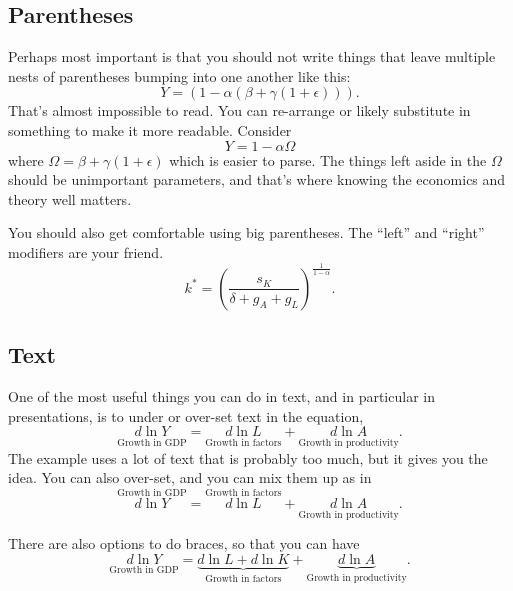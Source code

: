 \documentclass{article}
\begin{document}
\subsection*{Parentheses}
Perhaps most important is that you should not write things that leave multiple nests of parentheses bumping into one another like this:
\begin{equation*}
    Y = (1-\alpha(\beta+\gamma(1+\epsilon))).
\end{equation*}
That's almost impossible to read. You can re-arrange or likely substitute in something to make it more readable. Consider 
\begin{equation*}
    Y = 1-\alpha \Omega
\end{equation*}
where $\Omega = \beta+ \gamma(1+\epsilon)$ which is easier to parse. The things left aside in the $\Omega$ should be unimportant parameters, and that's where knowing the economics and theory well matters. 

You should also get comfortable using big parentheses. The ``left'' and ``right'' modifiers are your friend. 
\begin{equation}
    k^{\ast} = \left(\frac{s_K}{\delta+g_A+g_L}\right)^{\frac{1}{1-\alpha}}. \nonumber
\end{equation}

\subsection*{Text}
One of the most useful things you can do in text, and in particular in presentations, is to under or over-set text in the equation,
\begin{equation}
    \underset{\text{Growth in GDP}}{d \ln Y} = \underset{\text{Growth in factors}}{d \ln L} + \underset{\text{Growth in productivity}}{d \ln A}. \nonumber
\end{equation}
The example uses a lot of text that is probably too much, but it gives you the idea. You can also over-set, and you can mix them up as in
\begin{equation}
    \overset{\text{Growth in GDP}}{d \ln Y} = \overset{\text{Growth in factors}}{d \ln L} + \underset{\text{Growth in productivity}}{d \ln A}. \nonumber
\end{equation}

There are also options to do braces, so that you can have
\begin{equation}
    \underset{\text{Growth in GDP}}{d \ln Y} = \underbrace{d \ln L + d \ln K}_{\text{Growth in factors}} + \underbrace{d \ln A}_{\text{Growth in productivity}}. \nonumber
\end{equation}
\end{document}
